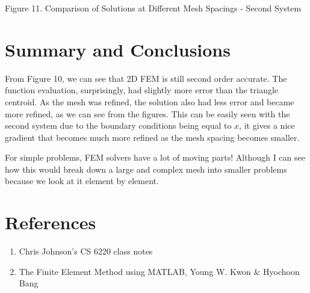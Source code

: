 \documentclass[11pt, oneside]{article}   	%
\begin{document}
\vspace{2mm}

\centerline {}
\centerline {}
\centerline{Figure 11. Comparison of Solutions at Different Mesh Spacings - Second System}

\section{Summary and Conclusions}

From Figure 10, we can see that 2D FEM is still second order accurate. The function evaluation, surprisingly, had slightly more error than the triangle centroid. As the mesh was refined, the solution also had less error and became more refined, as we can see from the figures. This can be easily seen with the second system due to the boundary conditions being equal to $x$, it gives a nice gradient that becomes much more refined as the mesh spacing becomes smaller.

For simple problems, FEM solvers have a lot of moving parts! Although I can see how this would break down a large and complex mesh into smaller problems because we look at it element by element.

\section{References}

\begin{enumerate}

\item Chris Johnson's CS 6220 class notes

\item The Finite Element Method using MATLAB, Young W. Kwon \& Hyochoon Bang

\end{enumerate}
\end{document}
